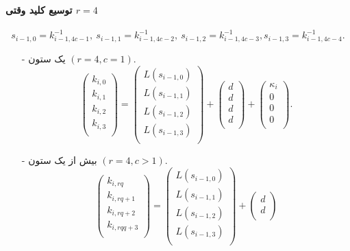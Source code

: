 \paragraph*{توسیع کلید وقتی 
	$r = 4$}
$$s_{i-1,0} = k_{i-1,4c-1}^{-1}, \ s_{i-1,1} = k_{i-1,4c-2}^{-1}, \ s_{i-1,2} = k_{i-1,4c-3}^{-1}, s_{i-1,3} = k_{i-1,4c-4}^{-1}.$$
\begin{itemize}
	\item[-]
	یک ستون 
	$(r = 4, c = 1)$.
	$$
	\begin{pmatrix}
	k_{i,0}\\
	k_{i,1}\\
	k_{i,2}\\
	k_{i,3}\\
	\end{pmatrix} = 
	\begin{pmatrix}
	L(s_{i-1,0})\\
	L(s_{i-1,1})\\
	L(s_{i-1,2})\\
	L(s_{i-1,3})\\
	\end{pmatrix} + 
	\begin{pmatrix}
	d\\
	d\\
	d\\
	d\\
	\end{pmatrix} + 
	\begin{pmatrix}
	\kappa_{i}\\
	0\\
	0\\
	0\\
	\end{pmatrix}.
	$$
	\item[-]
	بیش از یک ستون 
	$(r = 4, c > 1)$.
	$$
	\begin{pmatrix}
	k_{i,rq}\\
	k_{i,rq+1}\\
	k_{i,rq+2}\\
	k_{i,rqq+3}\\
	\end{pmatrix} = 
	\begin{pmatrix}
	L(s_{i-1,0})\\
	L(s_{i-1,1})\\
	L(s_{i-1,2})\\
	L(s_{i-1,3})\\
	\end{pmatrix} + 
	\begin{pmatrix}
	d\\
	d\\

\end{pmatrix}$$
\end{itemize}
